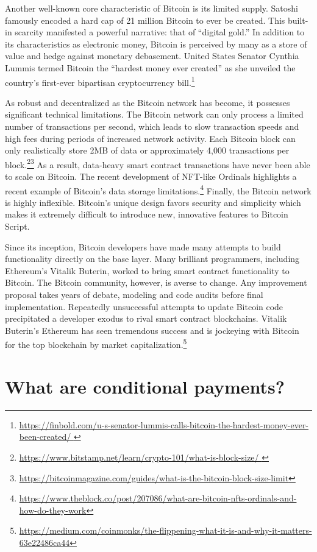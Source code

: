 \documentclass[twoside, a4paper, 11pt]{article}
\begin{document}
  Another well-known core characteristic of Bitcoin is its limited supply. Satoshi famously encoded a hard cap of 21 million Bitcoin to ever be created. This built-in scarcity manifested a powerful narrative: that of “digital gold.” In addition to its characteristics as electronic money, Bitcoin is perceived by many as a store of value and hedge against monetary debasement. United States Senator Cynthia Lummis termed Bitcoin the “hardest money ever created” as she unveiled the country’s first-ever bipartisan cryptocurrency bill.\footnote{\url{https://finbold.com/u-s-senator-lummis-calls-bitcoin-the-hardest-money-ever-been-created/ }}

  As robust and decentralized as the Bitcoin network has become, it possesses significant technical limitations. The Bitcoin network can only process a limited number of transactions per second, which leads to slow transaction speeds and high fees during periods of increased network activity. Each Bitcoin block can only realistically store 2MB of data or approximately 4,000 transactions per block.\footnote{\url{https://www.bitstamp.net/learn/crypto-101/what-is-block-size/ }}\footnote{\url{https://bitcoinmagazine.com/guides/what-is-the-bitcoin-block-size-limit}} As a result, data-heavy smart contract transactions have never been able to scale on Bitcoin. The recent development of NFT-like Ordinals highlights a recent example of Bitcoin’s data storage limitations.\footnote{\url{https://www.theblock.co/post/207086/what-are-bitcoin-nfts-ordinals-and-how-do-they-work}} Finally, the Bitcoin network is highly inflexible. Bitcoin’s unique design favors security and simplicity which makes it extremely difficult to introduce new, innovative features to Bitcoin Script.

  Since its inception, Bitcoin developers have made many attempts to build functionality directly on the base layer. Many brilliant programmers, including Ethereum’s Vitalik Buterin, worked to bring smart contract functionality to Bitcoin. The Bitcoin community, however, is averse to change. Any improvement proposal takes years of debate, modeling and code audits before final implementation. Repeatedly unsuccessful attempts to update Bitcoin code precipitated a developer exodus to rival smart contract blockchains. Vitalik Buterin’s Ethereum has seen tremendous success and is jockeying with Bitcoin for the top blockchain by market capitalization.\footnote{\url{https://medium.com/coinmonks/the-flippening-what-it-is-and-why-it-matters-63e22486ca44}}


  \section{What are conditional payments?}
\end{document}
